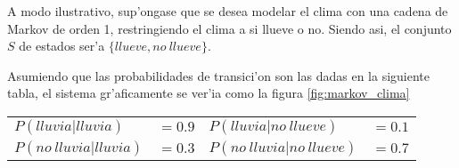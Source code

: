 A modo ilustrativo, sup'ongase que se desea modelar el clima con una cadena de Markov de orden 1, restringiendo el clima a si llueve o no. Siendo asi, el conjunto 
$S$ de estados ser'a $\{llueve, no\ llueve\}$. 

Asumiendo que las probabilidades de transici'on son las dadas en la siguiente tabla, el sistema gr'aficamente se ver'ia como la figura \ref{fig:markov_clima}

\begin{center}
\label{tabla_markov}
\begin{tabular}{l l l l}
$P(lluvia | lluvia) $ & $=0.9$ & $P(lluvia | no\ llueve) $& $=0.1$\\
$P(no\ lluvia | lluvia)  $ & $=0.3$ & $P(no\ lluvia | no\ llueve) $ & $=0.7$\\
\end{tabular}
\end{center}

\begin{imagen}
    \width{5cm}
\end{imagen}



